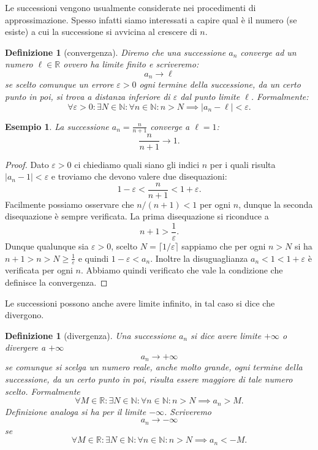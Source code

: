 \documentclass[italian,a4paper,oneside,headinclude]{scrbook}
\newcommand{\eps}{\varepsilon}
\newcommand{\NN}{\mathbb N}
\newcommand{\RR}{\mathbb R}
\newcommand{\abs}[1]{{\left|#1\right|}}
\newtheorem{example}[theorem]{Esempio}
\newtheorem{definition}[theorem]{Definizione}
\begin{document}
Le successioni vengono usualmente
considerate nei procedimenti di approssimazione.
Spesso infatti siamo interessati a capire qual è il numero (se esiste) a cui
la successione si avvicina al crescere di $n$.

\begin{definition}[convergenza]
Diremo che una successione $a_n$ converge
ad un numero $\ell \in \RR$
ovvero ha limite finito
e scriveremo:
\[
  a_n \to \ell
\]
se scelto comunque un errore $\eps>0$ ogni termine della successione,
da un certo punto in poi, si trova a distanza inferiore di $\eps$
dal punto limite $\ell$. Formalmente:
\[
\forall \eps>0\colon \exists N\in\NN \colon \forall n\in \NN\colon
n>N \implies \abs{a_n - \ell}
< \eps.
\]
\end{definition}

\begin{example}
La successione $a_n = \frac{n}{n+1}$ converge a $\ell=1$:
\[
  \frac{n}{n+1}\to 1.
\]
\end{example}
\begin{proof}
Dato $\eps>0$ ci chiediamo quali siano gli indici $n$
per i quali risulta $\abs{a_n -1}<\eps$ e troviamo
che devono valere due disequazioni:
\[
  1- \eps < \frac{n}{n+1} < 1+\eps.
\]
Facilmente possiamo osservare che $n/(n+1)<1$ per ogni $n$, dunque
la seconda disequazione è sempre verificata. La prima disequazione
si riconduce a
\[
 n + 1 > \frac{1}{\eps}.
\]
Dunque qualunque sia $\eps>0$, scelto $N = \lceil 1 / \eps\rceil$
sappiamo che per ogni $n>N$
si ha $n+1 > n > N \ge \frac{1}{\eps}$ e quindi $1-\eps < a_n$.
Inoltre la disuguaglianza $a_n < 1 < 1+\eps$ è verificata per ogni $n$.
Abbiamo quindi verificato che vale la condizione che definisce
la convergenza.
\end{proof}


Le successioni possono anche avere limite infinito,
 in tal
caso si dice che divergono.
\begin{definition}[divergenza]
Una successione $a_n$ si dice avere limite $+\infty$
o divergere a $+\infty$
\[
  a_n \to +\infty
\]
se comunque si scelga un numero reale, anche molto grande,
ogni termine della successione, da un certo punto in poi,
risulta essere maggiore di tale numero scelto. Formalmente
\[
  \forall M\in \RR\colon \exists N\in \NN \colon \forall n\in \NN\colon
  n>N \implies a_n >M.
\]
Definizione analoga si ha per il limite $-\infty$. Scriveremo
\[
  a_n \to -\infty
\]
se
\[
  \forall M\in \RR\colon \exists N\in \NN \colon \forall n\in \NN\colon
  n>N\implies a_n < -M.
\]
\end{definition}
\end{document}
